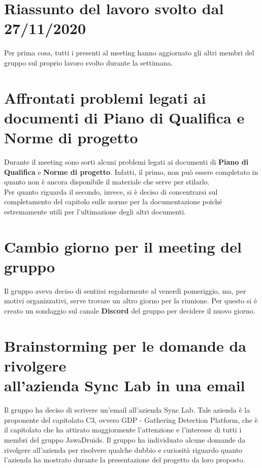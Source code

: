 	\section{Riassunto del lavoro svolto dal 27/11/2020}
	Per prima cosa, tutti i presenti al meeting hanno aggiornato gli altri membri del gruppo sul proprio lavoro svolto durante la settimana.
	
	\section{Affrontati problemi legati ai documenti di Piano di Qualifica e Norme di progetto}
	Durante il meeting sono sorti alcuni problemi legati ai documenti di \textbf{Piano di Qualifica} e \textbf{Norme di progetto}. Infatti, il primo, non può essere completato in quanto non è ancora disponibile il materiale che serve per stilarlo. \\
	Per quanto riguarda il secondo, invece, si è deciso di concentrarsi sul completamento del capitolo sulle norme per la documentazione poiché estremamente utili per l'ultimazione degli altri documenti.
	
	\section{Cambio giorno per il meeting del gruppo}
	Il gruppo aveva deciso di sentirsi regolarmente al venerdì pomeriggio, ma, per motivi organizzativi, serve trovare un altro giorno per la riunione. Per questo si è creato un sondaggio sul canale \textbf{Discord} del gruppo per decidere il nuovo giorno.
	
	\section{Brainstorming per le domande da rivolgere \\all'azienda Sync Lab in una email} 
	Il gruppo ha deciso di scrivere un'email all'azienda Sync Lab. Tale azienda è la proponente del capitolato C3, ovvero GDP - Gathering Detection Platform, che è il capitolato che ha attirato maggiormente l'attenzione e l'interesse di tutti i membri del gruppo JawaDruids. Il gruppo ha individuato alcune domande da rivolgere all'azienda per risolvere qualche dubbio e curiosità riguardo quanto l'azienda ha mostrato durante la presentazione del progetto da loro proposto. 
	
